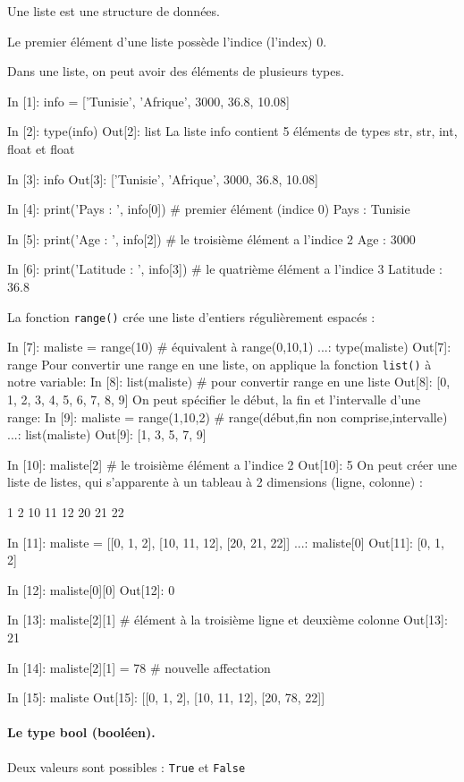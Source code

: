 \documentclass[%
oneside,                 %
final,                   %
10pt]{article}
\begin{document}
Une liste est une structure de données.

Le premier élément d'une liste possède l'indice (l'index) 0.

Dans une liste, on peut avoir des éléments de plusieurs types.

\bipy
In [1]: info = ['Tunisie', 'Afrique', 3000, 36.8, 10.08]

In [2]: type(info)
Out[2]: list
\eipy
La liste info contient 5 éléments de types str, str, int, float et float

\bipy
In [3]: info
Out[3]: ['Tunisie', 'Afrique', 3000, 36.8, 10.08]

In [4]: print('Pays : ', info[0])    # premier élément (indice 0)
Pays :  Tunisie

In [5]: print('Age : ', info[2])     # le troisième élément a l'indice 2
Age :  3000

In [6]: print('Latitude : ', info[3]) # le quatrième élément a l'indice 3
Latitude :  36.8
\eipy

La fonction \texttt{range()} crée une liste d'entiers régulièrement espacés :

\bipy
In [7]: maliste = range(10) # équivalent à range(0,10,1)
   ...: type(maliste)
Out[7]: range
\eipy
Pour convertir une range en une liste, on applique la fonction \texttt{list()} à notre variable:
\bipy
In [8]: list(maliste)   # pour convertir range en une liste
Out[8]: [0, 1, 2, 3, 4, 5, 6, 7, 8, 9]
\eipy
On peut spécifier le début, la fin et l'intervalle d'une range:
\bipy
In [9]: maliste = range(1,10,2)   # range(début,fin non comprise,intervalle)
   ...: list(maliste)
Out[9]: [1, 3, 5, 7, 9]

In [10]: maliste[2] # le troisième élément a l'indice 2
Out[10]: 5
\eipy
On peut créer une liste de listes, qui s'apparente à un tableau à 2 dimensions (ligne, colonne) :

   1   2
10  11  12
20  21  22
\eccq

\bipy
In [11]: maliste = [[0, 1, 2], [10, 11, 12], [20, 21, 22]]
    ...: maliste[0]
Out[11]: [0, 1, 2]

In [12]: maliste[0][0]
Out[12]: 0

In [13]: maliste[2][1] # élément à la troisième ligne et deuxième colonne
Out[13]: 21

In [14]: maliste[2][1] = 78   # nouvelle affectation

In [15]: maliste
Out[15]: [[0, 1, 2], [10, 11, 12], [20, 78, 22]]
\eipy
\paragraph{Le type bool (booléen).}
Deux valeurs sont possibles : \texttt{True} et \texttt{False}
\end{document}
